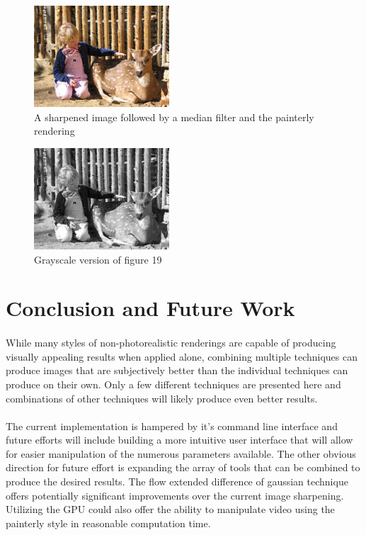 \documentclass[10pt,twocolumn]{article}
\begin{document}
\begin{figure}
\centering
\includegraphics[width=0.45\textwidth]{smoothpaintdeer.jpg}
\caption{A sharpened image followed by a median filter and the painterly rendering}
\end{figure}
\begin{figure}
\centering
\includegraphics[width=0.45\textwidth]{grayPc.jpg}
\caption{Grayscale version of figure 19}
\end{figure}

\section{Conclusion and Future Work}
	\paragraph{} While many styles of non-photorealistic renderings are capable of producing visually appealing results when applied alone, combining multiple techniques can produce images that are subjectively better than the individual techniques can produce on their own.  Only a few different techniques are presented here and combinations of other techniques will likely produce even better results.
	\paragraph{} The current implementation is hampered by it's command line interface and future efforts will include building a more intuitive user interface that will allow for easier manipulation of the numerous parameters available.  The other obvious direction for future effort is expanding the array of tools that can be combined to produce the desired results.  The flow extended difference of gaussian technique offers potentially significant improvements over the current image sharpening.  Utilizing the GPU could also offer the ability to manipulate video using the painterly style in reasonable computation time.
\end{document}
